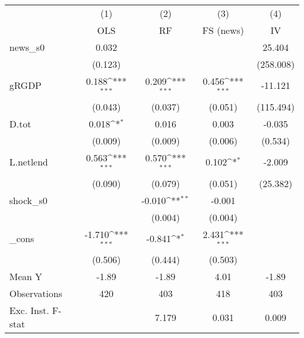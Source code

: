 {
\def\sym#1{\ifmmode^{#1}\else\(^{#1}\)\fi}
\begin{tabular}{l*{4}{c}}
\toprule
            &\multicolumn{1}{c}{(1)}&\multicolumn{1}{c}{(2)}&\multicolumn{1}{c}{(3)}&\multicolumn{1}{c}{(4)}\\
            &\multicolumn{1}{c}{OLS}&\multicolumn{1}{c}{RF}&\multicolumn{1}{c}{FS (news)}&\multicolumn{1}{c}{IV}\\
\midrule
news\_s0     &       0.032         &                     &                     &      25.404         \\
            &     (0.123)         &                     &                     &   (258.008)         \\
\addlinespace
gRGDP       &       0.188\sym{***}&       0.209\sym{***}&       0.456\sym{***}&     -11.121         \\
            &     (0.043)         &     (0.037)         &     (0.051)         &   (115.494)         \\
\addlinespace
D.tot       &       0.018\sym{*}  &       0.016         &       0.003         &      -0.035         \\
            &     (0.009)         &     (0.009)         &     (0.006)         &     (0.534)         \\
\addlinespace
L.netlend   &       0.563\sym{***}&       0.570\sym{***}&       0.102\sym{*}  &      -2.009         \\
            &     (0.090)         &     (0.079)         &     (0.051)         &    (25.382)         \\
\addlinespace
shock\_s0    &                     &      -0.010\sym{**} &      -0.001         &                     \\
            &                     &     (0.004)         &     (0.004)         &                     \\
\addlinespace
\_cons      &      -1.710\sym{***}&      -0.841\sym{*}  &       2.431\sym{***}&                     \\
            &     (0.506)         &     (0.444)         &     (0.503)         &                     \\
\midrule
Mean Y      &       -1.89         &       -1.89         &        4.01         &       -1.89         \\
Observations&         420         &         403         &         418         &         403         \\
Exc. Inst. F-stat&                     &       7.179         &       0.031         &       0.009         \\
\bottomrule
\end{tabular}
}
